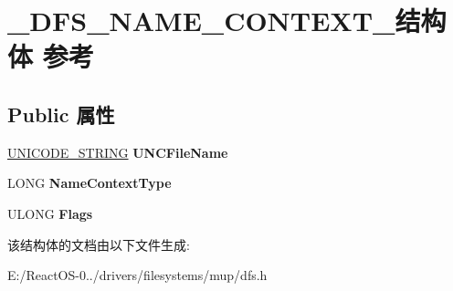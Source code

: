 \hypertarget{struct___d_f_s___n_a_m_e___c_o_n_t_e_x_t__}{}\section{\+\_\+\+D\+F\+S\+\_\+\+N\+A\+M\+E\+\_\+\+C\+O\+N\+T\+E\+X\+T\+\_\+结构体 参考}
\label{struct___d_f_s___n_a_m_e___c_o_n_t_e_x_t__}
\subsection*{Public 属性}
\begin{DoxyCompactItemize}
\item 
\mbox{\label{struct___d_f_s___n_a_m_e___c_o_n_t_e_x_t___ab3d87cb41055b5adcdceb3633fa2ce34}} 
\hyperlink{struct___u_n_i_c_o_d_e___s_t_r_i_n_g}{U\+N\+I\+C\+O\+D\+E\+\_\+\+S\+T\+R\+I\+NG} {\bfseries U\+N\+C\+File\+Name}
\item 
\mbox{\label{struct___d_f_s___n_a_m_e___c_o_n_t_e_x_t___ad969d9329427bd4966ee48deeb02072c}} 
L\+O\+NG {\bfseries Name\+Context\+Type}
\item 
\mbox{\label{struct___d_f_s___n_a_m_e___c_o_n_t_e_x_t___a186b37f70d2aa92fac92d6b1a2a009bb}} 
U\+L\+O\+NG {\bfseries Flags}
\end{DoxyCompactItemize}


该结构体的文档由以下文件生成\+:\begin{DoxyCompactItemize}
\item 
E\+:/\+React\+O\+S-\/0../drivers/filesystems/mup/dfs.\+h\end{DoxyCompactItemize}
